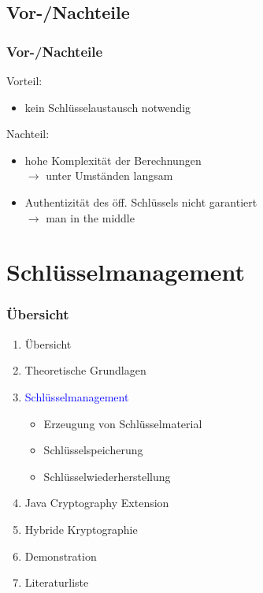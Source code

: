 \documentclass{beamer}
\begin{document}
\subsection*{Vor-/Nachteile}
\begin{frame}
\frametitle{Vor-/Nachteile}
Vorteil:
\begin{itemize}
\item kein Schlüsselaustausch notwendig
\end{itemize}
Nachteil:
\begin{itemize}
\item hohe Komplexität der Berechnungen\\ $\rightarrow$ unter Umständen langsam
\item Authentizität des öff. Schlüssels nicht garantiert 
\\$\rightarrow$ \glqq man in the middle\grqq
\end{itemize} 
\end{frame}

\section{Schlüsselmanagement}
\begin{frame}
\frametitle{Übersicht}
\begin{enumerate}
\item Übersicht
\item Theoretische Grundlagen
\item \textcolor{blue}{Schlüsselmanagement}
\begin{itemize}
	\item Erzeugung von Schlüsselmaterial
	\item Schlüsselspeicherung
	\item Schlüsselwiederherstellung
\end{itemize}
\item Java Cryptography Extension
\item Hybride Kryptographie
\item Demonstration
\item Literaturliste
\end{enumerate}
\end{frame}
\end{document}

